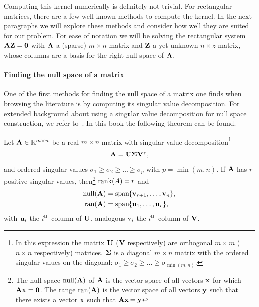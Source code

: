 Computing this kernel numerically is definitely not trivial. For rectangular matrices, there are a few well-known methods to compute the kernel. In the next paragraphs we will explore these methods and consider how well they are suited for our problem. For ease of notation we will be solving the rectangular system $\vb{A} \vb{Z} = \vb{0}$ with $\vb{A}$ a (sparse) $m\times n$ matrix and $\vb{Z}$ a yet unknown $n \times z$ matrix, whose columns are a basis for the right null space of $\vb{A}$.

\paragraph{Finding the null space of a matrix}
One of the first methods for finding the null space of a matrix one finds when browsing the literature is by computing its singular value decomposition. For extended background about using a singular value decomposition for null space construction, we refer to~\cite[section~2.4]{golub_matrix_2013}. In this book the following theorem can be found.

\begin{theorem}
    Let $\vb{A} \in \mathbb{R}^{m \times n}$ be a real $m \times n$ matrix with singular value decomposition\footnote{In this expression the matrix $\vb{U}$ ($\vb{V}$ respectively) are orthogonal $m \times m$ ($n \times n$ respectively) matrices. $\vb{\Sigma}$ is a diagonal $m \times n$ matrix with the ordered singular values on the diagonal: $\sigma_1 \geq \sigma_2 \geq \dots \geq \sigma_{\min(m, n)}$. }
    $$
        \vb{A} = \vb{U}\vb{\Sigma}{\vb{V}}^\intercal\text{,}
    $$
    and ordered singular values $\sigma_1 \geq \sigma_2 \geq \dots \geq \sigma_p$ with $p = \min(m, n)$.
    If $\vb{A}$ has $r$ positive singular values, then\footnote{The null space $\operatorname{null}(\vb{A})$ of $\vb{A}$ is the vector space of all vectors $\vb{x}$ for which $\vb{A} \vb{x} = \vb{0}$. The range $\operatorname{ran}(\vb{A})$ is the vector space of all vectors $\vb{y}$ such that there exists a vector $\vb{x}$ such that $\vb{A}\vb{x} = \vb{y}$} $\operatorname{rank}(A) = r$ and
    \begin{align*}
        \operatorname{null}(\vb{A}) & = \operatorname{span}\{\vb{v}_{r+1}, \dots, \vb{v}_{n}\}\text{,} \\
        \operatorname{ran}(\vb{A})  & = \operatorname{span}\{\vb{u}_{1}, \dots, \vb{u}_{r}\}\text{,}
    \end{align*}
    with $\vb{u}_i$ the $i^\text{th}$ column of $\vb{U}$, analogous $\vb{v}_i$ the $i^\text{th}$ column of $\vb{V}$.
\end{theorem}

